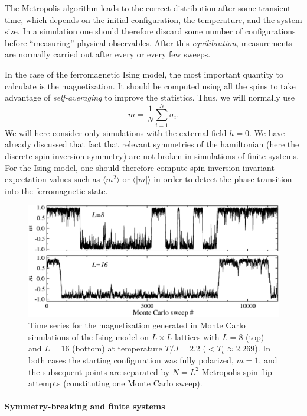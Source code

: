 \documentclass[draft,numberedheadings]{aipproc}
\begin{document}
The Metropolis algorithm leads to the correct distribution after some transient time, which depends on the initial configuration, the temperature, 
and the system size. In a  simulation one should therefore discard some number of configurations before ``measuring'' physical observables. After this 
{\it equilibration}, measurements are normally carried out after every or every few sweeps. 

In the case of the ferromagnetic Ising model, the most important quantity to calculate is the magnetization. It should be computed using all the spins to 
take advantage of {\it self-averaging} to improve the statistics. Thus, we will normally use
\begin{equation}
m = \frac{1}{N} \sum_{i=1}^N \sigma_i.
\label{mag1ising}
\end{equation}
We will here consider only simulations with the external field $h=0$. We have already discussed that fact that relevant symmetries of the 
hamiltonian (here the discrete spin-inversion symmetry) are not broken in simulations of finite systems. For the Ising model, one should therefore 
compute spin-inversion invariant expectation values such as $\langle m^2\rangle$ or $\langle |m|\rangle$ in order to detect the phase transition into the 
ferromagnetic state. 

\begin{figure}
\includegraphics[width=12.5cm, clip]{mtime2.eps}
\caption{Time series for the magnetization generated in Monte Carlo simulations of the Ising model on $L\times L$ lattices with $L=8$ (top) 
and $L=16$ (bottom) at temperature $T/J=2.2$ ($< T_c \approx 2.269$). In both cases the starting configuration was fully polarized, $m=1$, and 
the subsequent points are separated by $N=L^2$ Metropolis spin flip attempts (constituting one Monte Carlo sweep).}
\label{mtime}
\end{figure}

\paragraph{Symmetry-breaking and finite systems}
\end{document}
